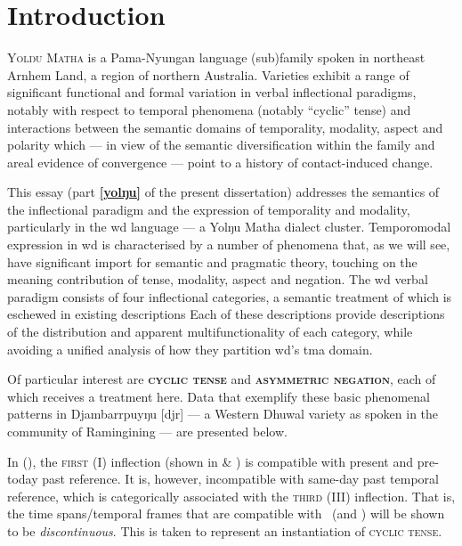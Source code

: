 
\section*{Introduction}%
\noindent\textsc{Yolŋu Matha} is a Pama-Nyungan language (sub)family spoken in northeast Arnhem Land, a region of northern Australia. Varieties exhibit a range of significant functional and formal variation in verbal inflectional paradigms, notably with respect to temporal phenomena  (notably “cyclic” tense) and interactions between the semantic domains of temporality, modality, aspect and polarity which --- in view of the semantic diversification within the family and areal evidence of convergence --- point to a history of contact-induced change.

This essay (part \textbf{\ref{yolŋu}} of the present dissertation) addresses the semantics of the inflectional paradigm and the expression of temporality and modality, particularly in the \acrfull{wd} language --- a Yolŋu Matha dialect cluster. Temporomodal expression in \gls{wd} is characterised by a number of phenomena that, as we will see, have significant import for semantic and pragmatic theory, touching on the meaning contribution of tense, modality, aspect and negation. The \acrshort{wd} verbal paradigm consists of four inflectional categories, a semantic treatment of which is eschewed in existing descriptions \citetext{\textit{i.e.}, \citealp{Wilkinson1991,Lowe1996,VanderWal1992}, \textit{see also} \citealt{Waters1989}.} Each of these descriptions provide descriptions of the distribution and apparent multifunctionality of each category, while avoiding a unified analysis of how they partition \acrshort{wd}'s \acrshort{tma} domain. 

Of particular interest are \textbf{\textsc{cyclic tense}} and \textbf{\textsc{asymmetric negation}}, each of which receives a treatment here. Data that exemplify these basic phenomenal patterns in Djambarrpuyŋu [\gls{djr}] --- a Western Dhuwal variety as spoken in the community of Ramingining --- are presented below.

In (), the \textsc{first} (\gls{I}) inflection (shown in \textit{} \& \textit{}) is compatible with present and pre-today past reference. It is, however, incompatible with same-day past temporal reference, which is categorically associated with the \textsc{third} (\gls{III}) inflection. That is, the time spans/temporal frames that are compatible with \I\ (and \III) will be shown to be \textit{discontinuous}. This is taken to represent an instantiation of \textsc{cyclic tense}.


